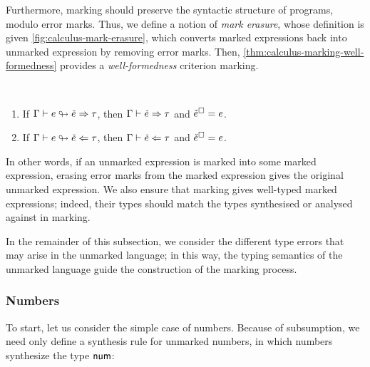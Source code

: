 Furthermore, marking should preserve the syntactic structure of programs, modulo error marks. Thus,
we define a notion of \emph{mark erasure}, whose definition is given
\cref{fig:calculus-mark-erasure}, which converts marked expressions back into unmarked expression by
removing error marks. Then, \cref{thm:calculus-marking-well-formedness} provides a
\emph{well-formedness} criterion marking.
%
\begin{theorem}[name=Marking Well-Formedness] \
  \label{thm:calculus-marking-well-formedness}
  \begin{enumerate}
    \item If $\Gamma \vdash e \looparrowright \check{e} \Rightarrow \tau$, then $\Gamma \vdash \check{e} \Rightarrow \tau$ and
      $\check{e}^{\square} = e$.
    \item If $\Gamma \vdash e \looparrowright \check{e} \Leftarrow \tau$, then $\Gamma \vdash \check{e} \Leftarrow \tau$ and
      $\check{e}^{\square} = e$.
  \end{enumerate}
\end{theorem}
%
In other words, if an unmarked expression is marked into some marked expression, erasing error marks
from the marked expression gives the original unmarked expression. We also ensure that marking gives
well-typed marked expressions; indeed, their types should match the types synthesised or analysed
against in marking. %



In the remainder of this subsection, we consider the different type errors that may arise in the
unmarked language; in this way, the typing semantics of the unmarked language guide the construction
of the marking process.

\subsubsection{Numbers}
\label{sec:calculus-numbers}

To start, let us consider the simple case of numbers. Because of subsumption, we need only define a
synthesis rule for unmarked numbers, in which numbers synthesize the type ${\normalfont\textsf{num}}$:
%
\begin{mathpar}
\end{mathpar}

